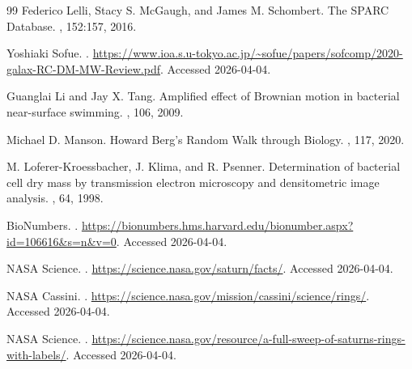 \begin{thebibliography}{99}
Federico Lelli, Stacy S. McGaugh, and James M. Schombert.
\newblock The SPARC Database.
, 152:157, 2016.

Yoshiaki Sofue.
.
\newblock \url{https://www.ioa.s.u-tokyo.ac.jp/~sofue/papers/sofcomp/2020-galax-RC-DM-MW-Review.pdf}. Accessed 2026-04-04.

Guanglai Li and Jay X. Tang.
\newblock Amplified effect of Brownian motion in bacterial near-surface swimming.
, 106, 2009.

Michael D. Manson.
\newblock Howard Berg's Random Walk through Biology.
, 117, 2020.

M. Loferer-Kroessbacher, J. Klima, and R. Psenner.
\newblock Determination of bacterial cell dry mass by transmission electron microscopy and densitometric image analysis.
, 64, 1998.

BioNumbers.
.
\newblock \url{https://bionumbers.hms.harvard.edu/bionumber.aspx?id=106616&s=n&v=0}. Accessed 2026-04-04.

NASA Science.
.
\newblock \url{https://science.nasa.gov/saturn/facts/}. Accessed 2026-04-04.

NASA Cassini.
.
\newblock \url{https://science.nasa.gov/mission/cassini/science/rings/}. Accessed 2026-04-04.

NASA Science.
.
\newblock \url{https://science.nasa.gov/resource/a-full-sweep-of-saturns-rings-with-labels/}. Accessed 2026-04-04.

\end{thebibliography}

